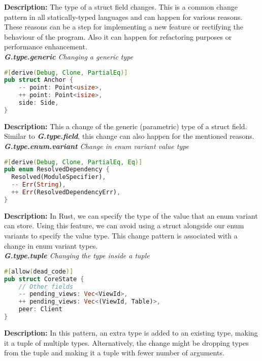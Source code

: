 \noindent \textbf{Description:} The type of a struct field changes. This is a common change pattern in all statically-typed languages and can happen for various reasons. These reasons can be a step for implementing a new feature or rectifying the behaviour of the program. Also it can happen for refactoring purposes or performance enhancement. \\


\noindent \textit{ \textbf{G.type.generic} Changing a generic type}

\begin{lstlisting}[language=Rust, style=colouredRust]
#[derive(Debug, Clone, PartialEq)]
pub struct Anchor {
    -- point: Point<usize>,
    ++ point: Point<isize>,
    side: Side,
}

\end{lstlisting}

\noindent \textbf{Description:} This a change of the generic (parametric) type of a struct field. Similar to \textit{\textbf{G.type.field}}, this change can also happen for the mentioned reasons. \\

\noindent \textit{ \textbf{G.type.enum.variant} Change in enum variant value type}

\begin{lstlisting}[language=Rust, style=colouredRust]
#[derive(Debug, Clone, PartialEq, Eq)]
pub enum ResolvedDependency {
  Resolved(ModuleSpecifier),
  -- Err(String),
  ++ Err(ResolvedDependencyErr),
}

\end{lstlisting}

\noindent \textbf{Description:} In Rust, we can specify the type of the value that an enum variant can store. Using this feature, we can avoid using a struct alongside our enum variants to specify the value type. This change pattern is associated with a change in enum variant types. \\


\noindent \textit{ \textbf{G.type.tuple} Changing the type inside a tuple}

\begin{lstlisting}[language=Rust, style=colouredRust]
#[allow(dead_code)]
pub struct CoreState {
    // Other fields
    -- pending_views: Vec<ViewId>,
    ++ pending_views: Vec<(ViewId, Table)>,
    peer: Client
}
\end{lstlisting}



\noindent \textbf{Description:} In this pattern, an extra type is added to an existing type, making it a tuple of multiple types. Alternatively, the change might be dropping types from the tuple and making it a tuple with fewer number of arguments.

